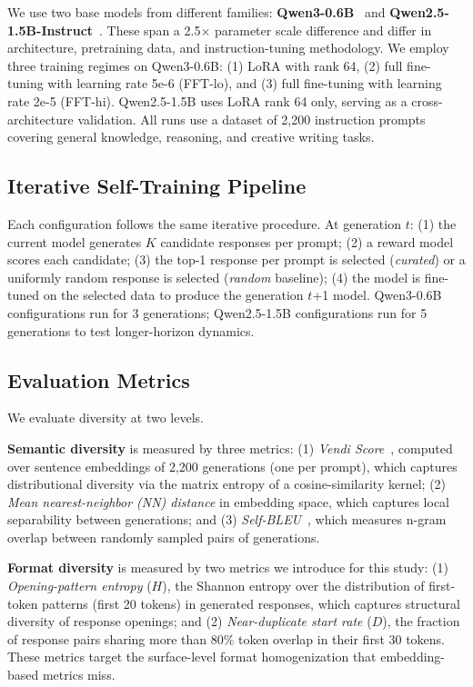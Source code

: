 \documentclass[11pt,a4paper]{article}
\begin{document}
We use two base models from different families: \textbf{Qwen3-0.6B}~\cite{qwen2025qwen3} and \textbf{Qwen2.5-1.5B-Instruct}~\cite{qwen2024qwen25}. These span a 2.5$\times$ parameter scale difference and differ in architecture, pretraining data, and instruction-tuning methodology. We employ three training regimes on Qwen3-0.6B: (1) LoRA with rank 64, (2) full fine-tuning with learning rate 5e-6 (FFT-lo), and (3) full fine-tuning with learning rate 2e-5 (FFT-hi). Qwen2.5-1.5B uses LoRA rank 64 only, serving as a cross-architecture validation. All runs use a dataset of 2,200 instruction prompts covering general knowledge, reasoning, and creative writing tasks.

\subsection{Iterative Self-Training Pipeline}

Each configuration follows the same iterative procedure. At generation $t$: (1) the current model generates $K$ candidate responses per prompt; (2) a reward model scores each candidate; (3) the top-1 response per prompt is selected (\textit{curated}) or a uniformly random response is selected (\textit{random} baseline); (4) the model is fine-tuned on the selected data to produce the generation $t$+1 model. Qwen3-0.6B configurations run for 3 generations; Qwen2.5-1.5B configurations run for 5 generations to test longer-horizon dynamics.

\subsection{Evaluation Metrics}

We evaluate diversity at two levels.

\textbf{Semantic diversity} is measured by three metrics: (1) \textit{Vendi Score}~\cite{friedman2023vendi}, computed over sentence embeddings of 2,200 generations (one per prompt), which captures distributional diversity via the matrix entropy of a cosine-similarity kernel; (2) \textit{Mean nearest-neighbor (NN) distance} in embedding space, which captures local separability between generations; and (3) \textit{Self-BLEU}~\cite{zhu2018texygen}, which measures n-gram overlap between randomly sampled pairs of generations.

\textbf{Format diversity} is measured by two metrics we introduce for this study: (1) \textit{Opening-pattern entropy} ($H$), the Shannon entropy over the distribution of first-token patterns (first 20 tokens) in generated responses, which captures structural diversity of response openings; and (2) \textit{Near-duplicate start rate} ($D$), the fraction of response pairs sharing more than 80\% token overlap in their first 30 tokens. These metrics target the surface-level format homogenization that embedding-based metrics miss.
\end{document}
